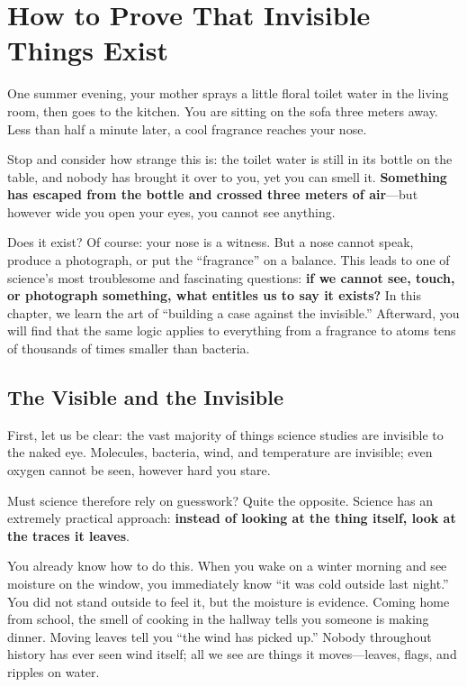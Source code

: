 \chapter{How to Prove That Invisible Things Exist}

\begin{kaichang}
One summer evening, your mother sprays a little floral toilet water in the living room, then goes to the kitchen. You are sitting on the sofa three meters away. Less than half a minute later, a cool fragrance reaches your nose.

Stop and consider how strange this is: the toilet water is still in its bottle on the table, and nobody has brought it over to you, yet you can smell it. \textbf{Something has escaped from the bottle and crossed three meters of air}---but however wide you open your eyes, you cannot see anything.

Does it exist? Of course: your nose is a witness. But a nose cannot speak, produce a photograph, or put the ``fragrance'' on a balance. This leads to one of science's most troublesome and fascinating questions: \textbf{if we cannot see, touch, or photograph something, what entitles us to say it exists?} In this chapter, we learn the art of ``building a case against the invisible.'' Afterward, you will find that the same logic applies to everything from a fragrance to atoms tens of thousands of times smaller than bacteria.
\end{kaichang}

\section{The Visible and the Invisible}

First, let us be clear: the vast majority of things science studies are invisible to the naked eye. Molecules, bacteria, wind, and temperature are invisible; even oxygen cannot be seen, however hard you stare.

Must science therefore rely on guesswork? Quite the opposite. Science has an extremely practical approach: \textbf{instead of looking at the thing itself, look at the traces it leaves}.

You already know how to do this. When you wake on a winter morning and see moisture on the window, you immediately know ``it was cold outside last night.'' You did not stand outside to feel it, but the moisture is evidence. Coming home from school, the smell of cooking in the hallway tells you someone is making dinner. Moving leaves tell you ``the wind has picked up.'' Nobody throughout history has ever seen wind itself; all we see are things it moves---leaves, flags, and ripples on water.

